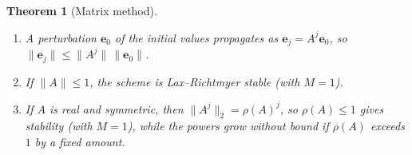 \documentclass[11pt,a4paper]{article}
\numberwithin{equation}{section}
\theoremstyle{spacedplain}
\newtheorem{theorem}{Theorem}[section]
\theoremstyle{spaceddefinition}
\theoremstyle{spacedremark}
\begin{document}
\begin{keybox}
\begin{theorem}[Matrix method]\label{thm:matrix}
\leavevmode
\begin{enumerate}[label=(\alph*)]
  \item A perturbation \(\mathbf e_0\) of the initial values propagates
    as \(\mathbf e_j=A^j\mathbf e_0\), so
    \(\|\mathbf e_j\|\le\|A^j\|\,\|\mathbf e_0\|\).
  \item If \(\|A\|\le1\), the scheme is Lax--Richtmyer stable (with
    \(M=1\)).
  \item If \(A\) is real and symmetric, then \(\|A^j\|_2=\rho(A)^j\), so
    \(\rho(A)\le1\) gives stability (with \(M=1\)), while the powers
    grow without bound if \(\rho(A)\) exceeds \(1\) by a fixed amount.
\end{enumerate}
\end{theorem}
\end{keybox}
\end{document}
